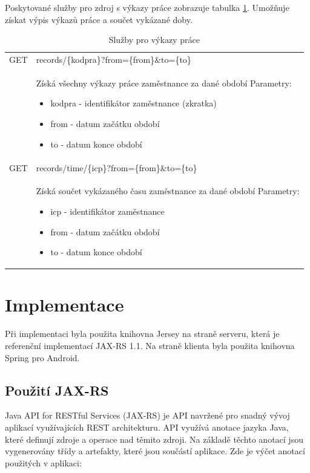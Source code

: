 \documentclass{diplomka}
\begin{document}
\noindent
Poskytované služby pro zdroj s výkazy práce zobrazuje tabulka \ref{tab:urirecords}. Umožňuje získat výpis výkazů práce a součet vykázané doby.
\begin{table}[H]
\begin{center}
\begin{tabular}{| m{2cm} |  m{10cm} |}
\hline
\rowcolor{Gray}
GET  &records/\{kodpra\}?from=\{from\}\&to=\{to\} \\ 
&  \parbox{10cm}{\vspace{5 mm}Získá všechny výkazy práce zaměstnance za dané období\\
Parametry:\begin{itemize}[noitemsep,nolistsep]
\item kodpra - identifikátor zaměstnance (zkratka)
\item from - datum začátku období
\item to - datum konce období
\end{itemize}
\vspace{5 mm}} \\ \hline
{}
GET & records/time/\{icp\}?from=\{from\}\&to=\{to\} \\ \hline
&  \parbox{10cm}{\vspace{5 mm}Získá součet vykázaného času zaměstnance za dané období\\
Parametry:\begin{itemize}[noitemsep,nolistsep]
\item icp - identifikátor zaměstnance
\item from - datum začátku období
\item to - datum konce období
\end{itemize}
\vspace{5 mm}} \\ \hline
\end{tabular}
\end{center}
\caption{Služby pro výkazy práce}
\label{tab:urirecords}
\end{table}



\section{Implementace}
Při implementaci byla použita knihovna Jersey\cite{jersey} na straně serveru, která je referenční implementací JAX-RS 1.1\cite{jaxrs}. Na straně klienta byla použita knihovna Spring pro Android.

\subsection{Použití JAX-RS}
Java API for RESTful Services (JAX-RS) je API navržené pro snadný vývoj aplikací využívajících REST architekturu. API využívá anotace jazyka Java, které definují zdroje a operace nad těmito zdroji. Na základě těchto anotací jsou vygenerovány třídy a artefakty, které jsou součástí aplikace. Zde je výčet anotací použitých v aplikaci:
\end{document}
